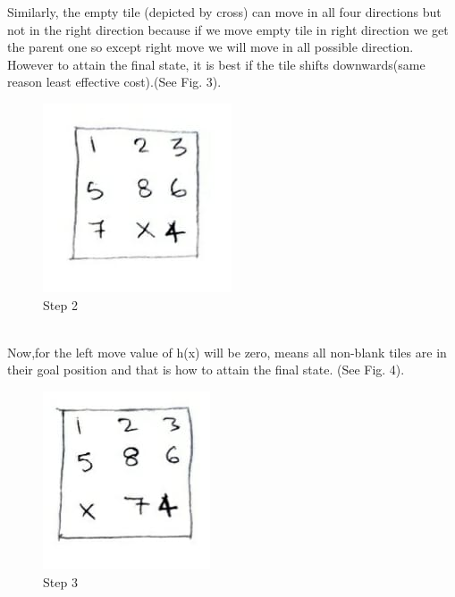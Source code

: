 Similarly, the empty tile (depicted by cross) can move in all four directions but not in the right direction because if we move empty tile in right direction we get the parent one so except right move we will move in all possible direction. However to attain the final state, it is best if the tile shifts downwards(same reason least effective cost).(See Fig. 3).\\
\begin{figure}[htbp]
    \centering
    \includegraphics[scale = 0.50]{step2.jpeg}
    \caption{Step 2}
\end{figure}\\

Now,for the left move value of h(x) will be zero, means all non-blank tiles are in their goal position and that is how to attain the final state. (See Fig. 4).
\begin{figure}[htbp]
    \centering
    \includegraphics[scale = 0.50]{step3.jpeg}
    \caption{Step 3}
\end{figure}\\

